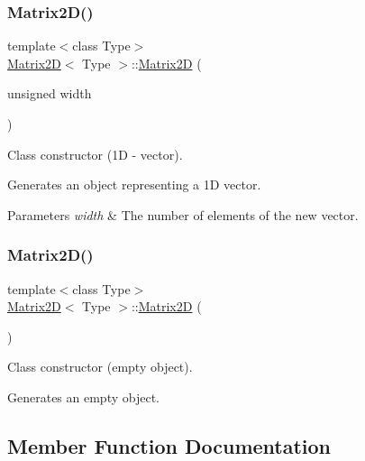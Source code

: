 \subsubsection{\texorpdfstring{Matrix2\+D()}{Matrix2D()}\hspace{0.1cm}{\footnotesize\ttfamily [2/3]}}
{\footnotesize\ttfamily template$<$class Type$>$ \\
\hyperlink{classMatrix2D}{Matrix2D}$<$ Type $>$\+::\hyperlink{classMatrix2D}{Matrix2D} (\begin{DoxyParamCaption}\item[{unsigned}]{width }\end{DoxyParamCaption})\hspace{0.3cm}{\ttfamily [inline]}}



Class constructor (1D -\/ vector). 

Generates an object representing a 1D vector. 
\begin{DoxyParams}{Parameters}
{\em width} & The number of elements of the new vector. \\
\hline
\end{DoxyParams}
\mbox{\label{classMatrix2D_a5a6653f697f1c397669bd556c1fd272a}} 
\subsubsection{\texorpdfstring{Matrix2\+D()}{Matrix2D()}\hspace{0.1cm}{\footnotesize\ttfamily [3/3]}}
{\footnotesize\ttfamily template$<$class Type$>$ \\
\hyperlink{classMatrix2D}{Matrix2D}$<$ Type $>$\+::\hyperlink{classMatrix2D}{Matrix2D} (\begin{DoxyParamCaption}{ }\end{DoxyParamCaption})\hspace{0.3cm}{\ttfamily [inline]}}



Class constructor (empty object). 

Generates an empty object. 

\subsection{Member Function Documentation}
\mbox{\label{classMatrix2D_a2845ff86d7f24ccd338b42b2a9cbe017}} 

